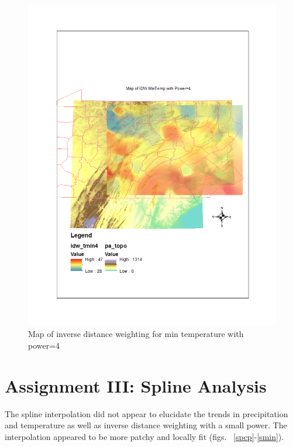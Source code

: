 \documentclass{article}\usepackage[]{graphicx}\usepackage[]{color}
\begin{document}
\begin{figure}
\includegraphics[scale=.9]{./figure/IDWmin4}
\caption{Map of inverse distance weighting for min temperature with power=4}
\label{idwmin4}
\end{figure}

\FloatBarrier


\section{Assignment III: Spline Analysis}
The spline interpolation did not appear to elucidate the trends in precipitation and temperature as well as inverse distance weighting with a small power.  The interpolation appeared to be more patchy and locally fit (figs. ~\ref{spcp}-\ref{smin}).\\
\end{document}
